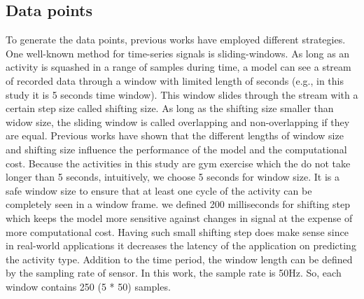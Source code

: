 \documentclass[journal,article,submit,moreauthors,pdftex]{Definitions/mdpi}
\begin{document}
\subsection{Data points}
To generate the data points, previous works have employed different strategies. One well-known method for time-series signals is sliding-windows. As long as an activity is squashed in a range of samples during time, a model can see a stream of recorded data through a window with limited length of seconds (e.g., in this study it is 5 seconds time window). This window slides through the stream with a certain step size called shifting size. As long as the shifting size smaller than widow size, the sliding window is called overlapping and non-overlapping if they are equal. Previous works have shown that the different lengths of window size and shifting size influence the performance of the model and the computational cost. Because the activities in this study are gym exercise which the do not take longer than 5 seconds, intuitively, we choose 5 seconds for window size. It is a safe window size to ensure that at least one cycle of the activity can be completely seen in a window frame. we defined 200 milliseconds for shifting step which keeps the model more sensitive against changes in signal at the expense of more computational cost. Having such small shifting step does make sense since in real-world applications it decreases the latency of the application on predicting the activity type. Addition to the time period, the window length can be defined by the sampling rate of sensor. In this work, the sample rate is 50Hz. So, each window contains 250 (5 * 50) samples.
\end{document}
